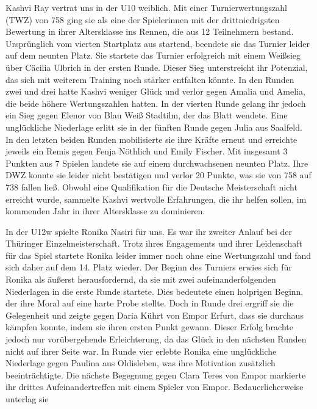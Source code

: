 \documentclass[a4paper,ngerman]{tui-algo-seminar}
\begin{document}
Kashvi Ray vertrat uns in der U10 weiblich. Mit einer Turnierwertungszahl (TWZ) von 758 ging sie als eine der Spielerinnen mit der drittniedrigsten Bewertung in ihrer Altersklasse ins Rennen, die aus 12 Teilnehmern bestand. Ursprünglich vom vierten Startplatz aus startend, beendete sie das Turnier leider auf dem neunten Platz. Sie startete das Turnier erfolgreich mit einem Weißsieg über Cäcilia Ulbrich in der ersten Runde. Dieser Sieg unterstreicht ihr Potenzial, das sich mit weiterem Training noch stärker entfalten könnte. In den Runden zwei und drei hatte Kashvi weniger Glück und verlor gegen Amalia und Amelia, die beide höhere Wertungszahlen hatten. In der vierten Runde gelang ihr jedoch ein Sieg gegen Elenor von Blau Weiß Stadtilm, der das Blatt wendete. Eine unglückliche Niederlage erlitt sie in der fünften Runde gegen Julia aus Saalfeld. In den letzten beiden Runden mobilisierte sie ihre Kräfte erneut und erreichte jeweils ein Remis gegen Fenja Nöthlich und Emily Fischer. Mit insgesamt 3 Punkten aus 7 Spielen landete sie auf einem durchwachsenen neunten Platz. Ihre DWZ konnte sie leider nicht bestätigen und verlor 20 Punkte, was sie von 758 auf 738 fallen ließ. Obwohl eine Qualifikation für die Deutsche Meisterschaft nicht erreicht wurde, sammelte Kashvi wertvolle Erfahrungen, die ihr helfen sollen, im kommenden Jahr in ihrer Altersklasse zu dominieren.

In der U12w spielte Ronika Nasiri für uns. Es war ihr zweiter Anlauf bei der Thüringer Einzelmeisterschaft. Trotz ihres Engagements und ihrer Leidenschaft für das Spiel startete Ronika leider immer noch ohne eine Wertungszahl und fand sich daher auf dem 14. Platz wieder. Der Beginn des Turniers erwies sich für Ronika als äußerst herausfordernd, da sie mit zwei aufeinanderfolgenden Niederlagen in die erste Runde startete. Dies bedeutete einen holprigen Beginn, der ihre Moral auf eine harte Probe stellte. Doch in Runde drei ergriff sie die Gelegenheit und zeigte gegen Daria Kührt von Empor Erfurt, dass sie durchaus kämpfen konnte, indem sie ihren ersten Punkt gewann. Dieser Erfolg brachte jedoch nur vorübergehende Erleichterung, da das Glück in den nächsten Runden nicht auf ihrer Seite war. In Runde vier erlebte Ronika eine unglückliche Niederlage gegen Paulina aus Oldisleben, was ihre Motivation zusätzlich beeinträchtigte. Die nächste Begegnung gegen Clara Teres von Empor markierte ihr drittes Aufeinandertreffen mit einem Spieler von Empor. Bedauerlicherweise unterlag sie
\end{document}
